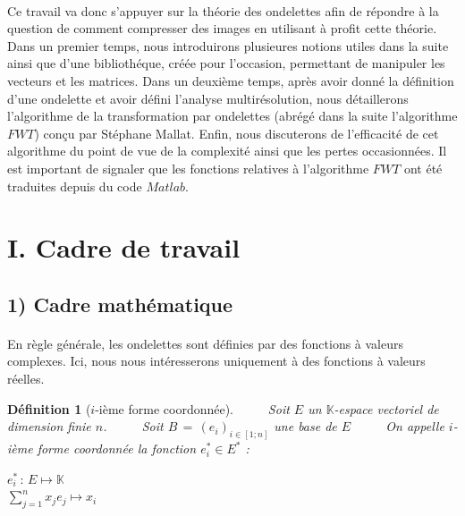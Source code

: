 \documentclass[a4paper,10pt]{report}
\theoremstyle{break}
\newtheorem{Def}{D\'{e}finition}
\begin{document}
  \paragraph{} Ce travail va donc s'appuyer sur la th\'{e}orie des ondelettes afin de r\'{e}pondre \`{a} la question de comment
      compresser des images en utilisant \`{a} profit cette th\'{e}orie. Dans un premier temps, nous introduirons plusieures
      notions utiles dans la suite ainsi que d'une biblioth\'{e}que, cr\'{e}\'{e}e pour l'occasion, permettant de manipuler les vecteurs 
      et les matrices. Dans un deuxi\`{e}me temps, apr\`{e}s avoir donn\'{e} la d\'{e}finition d'une ondelette et avoir d\'{e}fini l'analyse 
      multir\'{e}solution, nous d\'{e}taillerons l'algorithme de la transformation par ondelettes (abr\'{e}g\'{e} dans la suite l'algorithme 
      $FWT$) con{\c c}u par St\'{e}phane Mallat. Enfin, nous discuterons de l'efficacit\'{e} de cet algorithme du point de vue de la 
      complexit\'{e} ainsi que les pertes occasionn\'{e}es. \newline
      Il est important de signaler que les fonctions relatives \`{a} l'algorithme $FWT$ ont \'{e}t\'{e} traduites depuis du code $Matlab$.

\newpage

\section*{I. Cadre de travail}

  \subsection*{1) Cadre math\'{e}matique}
  
    \paragraph{} En r\`{e}gle g\'{e}n\'{e}rale, les ondelettes sont d\'{e}finies par des fonctions \`{a} valeurs complexes. 
      Ici, nous nous int\'{e}resserons uniquement \`{a} des fonctions \`{a} valeurs r\'{e}elles.
      
    \begin{Def}[$i$-i\`{e}me forme coordonn\'{e}e]
    
	$\phantom{Prop}$ Soit $E$ un $\mathbb{K}$-espace vectoriel de dimension finie $n$. \newline
	$\phantom{Prop}$ Soit $B \, = \, (e_i)_{i \in [1;n]}$ une base de $E$ \newline
	$\phantom{Prop}$ On appelle $i$-i\`{e}me forme coordonn\'{e}e la fonction $ e_i^* \in E^* $ :
	\begin{center}
	  $ e_i^* \, : \, E \mapsto \mathbb{K} $ \\
	  $ \displaystyle\sum_{j = 1}^n x_j e_j \longmapsto x_i $
	\end{center}
      
    \end{Def}
    
\end{document}
